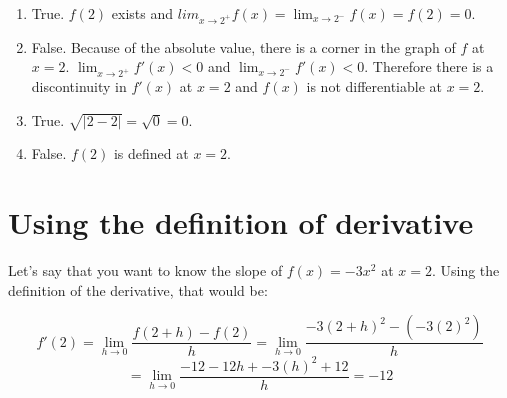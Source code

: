 \begin{Answer}[ref=diff1]
	\begin{enumerate}
		\item True. $f(2)$ exists and $lim_{x \to 2^+}f(x) = 
		\lim_{x \to 2^-}f(x) = f(2) = 0$. 
		\item False. Because of the absolute value, there is a corner in 
		the graph of $f$ at $x=2$. $\lim_{x \to 2^+}f'(x) < 0$ and 
		$\lim_{x \to 2^-}f'(x) < 0$. Therefore there is a discontinuity in 
		$f'(x)$ at $x = 2$ and $f(x)$ is not differentiable at $x = 2$. 
		\item True. $\sqrt{|2-2|} = \sqrt{0} = 0$.
		\item False. $f(2)$ is defined at $x = 2$. 
	\end{enumerate}
\end{Answer}

\section{Using the definition of derivative}

Let's say that you want to know the slope of $f(x) = -3x^2$ at $x = 2$.
Using the definition of the derivative, that would be:

$$f'(2) = \lim_{h \to 0}\frac{f(2 + h) - f(2)}{h} 
= \lim_{h \to 0}\frac{-3(2 + h)^2- \left(-3(2)^2\right)}
{h} $$
$$= \lim_{h \to 0}\frac{-12 - 12h + 
-3(h)^2 + 12}{h} = -12$$ 


